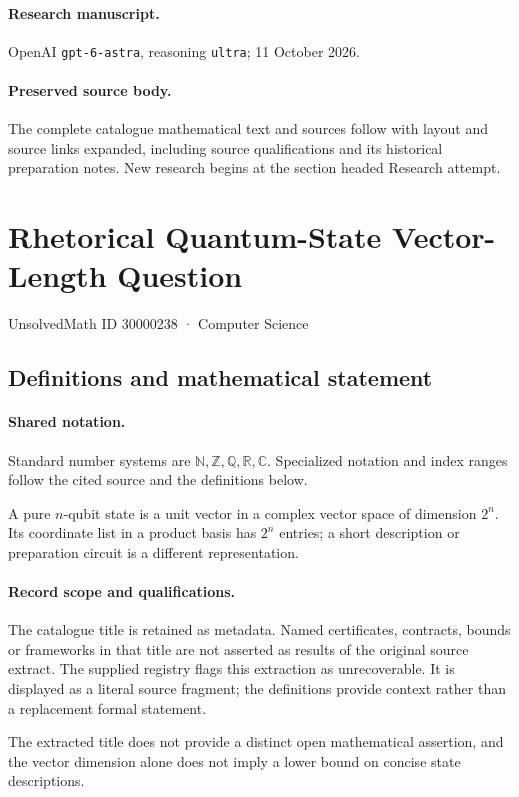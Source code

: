 \documentclass[11pt]{article}
\begin{document}
\paragraph{Research manuscript.} OpenAI \texttt{gpt-6-astra}, reasoning \texttt{ultra}; 11 October 2026.
\paragraph{Preserved source body.} The complete catalogue mathematical text and sources follow with layout and source links expanded, including source qualifications and its historical preparation notes. New research begins at the section headed Research attempt.

\section{Rhetorical Quantum-State Vector-Length Question}\label{30000238}
{\small UnsolvedMath ID 30000238 · Computer Science}
\subsection{Definitions and mathematical statement}

\paragraph{Shared notation.}Standard number systems are $\mathbb N,\mathbb Z,\mathbb Q,\mathbb R,\mathbb C$. Specialized notation and index ranges follow the cited source and the definitions below.


A pure $n$-qubit state is a unit vector in a complex vector space of dimension $2^n$. Its coordinate list in a product basis has $2^n$ entries; a short description or preparation circuit is a different representation.
\paragraph{Record scope and qualifications.}
The catalogue title is retained as metadata. Named certificates, contracts, bounds or frameworks in that title are not asserted as results of the original source extract.
The supplied registry flags this extraction as unrecoverable. It is displayed as a literal source fragment; the definitions provide context rather than a replacement formal statement.

The extracted title does not provide a distinct open mathematical assertion, and the vector dimension alone does not imply a lower bound on concise state descriptions.
\end{document}
